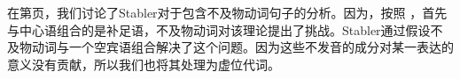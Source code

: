 \noindent
在第\pageref{Beispiel-leeres-Element-intransitive-Verben}页，我们讨论了Stabler对于包含不及物动词句子的分析。因为，按照 \citet[]{Chomsky2008a}，首先与中心语组合的是补足语，不及物动词对该理论提出了挑战。Stabler通过假设不及物动词与一个空宾语组合解决了这个问题\citep[,124]{Veenstra98a}。因为这些不发音的成分对某一表达的意义没有贡献，所以我们也将其处理为虚位代词。


